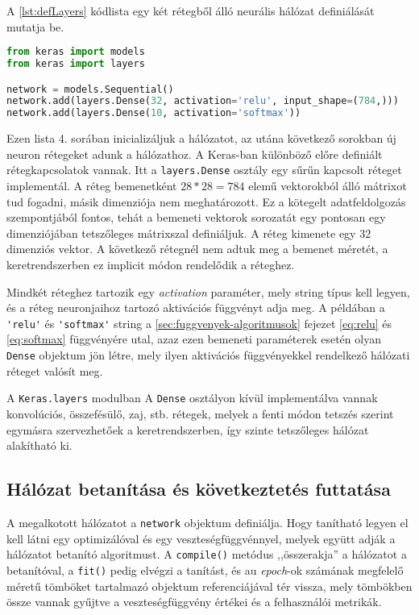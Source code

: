 A \ref{lst:defLayers} kódlista egy két rétegből álló neurális hálózat definiálását mutatja be.
\begin{minipage}{\linewidth}
\begin{lstlisting}[language=Python, caption=Két Neurális hálózat rétegeinek definiálása]
from keras import models
from keras import layers

network = models.Sequential()
network.add(layers.Dense(32, activation='relu', input_shape=(784,)))
network.add(layers.Dense(10, activation='softmax'))
\end{lstlisting}\label{lst:defLayers}
\end{minipage}
Ezen lista 4. sorában inicializáljuk a hálózatot, az utána következő sorokban új neuron rétegeket adunk a hálózathoz. A Keras-ban különböző előre definiált rétegkapcsolatok vannak. Itt a \verb|layers.Dense| osztály egy sűrűn kapcsolt réteget implementál. %
A réteg bemenetként $28 *28 = 784$ elemű vektorokból álló mátrixot tud fogadni, másik dimenziója nem meghatározott. Ez a kötegelt adatfeldolgozás szempontjából fontos, tehát a bemeneti vektorok sorozatát egy pontosan egy dimenziójában tetszőleges mátrixszal definiáljuk. A réteg kimenete egy 32 dimenziós vektor. A következő rétegnél nem adtuk meg a bemenet méretét, a keretrendszerben ez implicit módon rendelődik a réteghez. 

Mindkét réteghez tartozik egy \emph{activation} paraméter, mely string típus kell legyen, és a réteg neuronjaihoz tartozó aktivációs függvényt adja meg. A példában a \verb|'relu'| és \verb|'softmax'| string a \ref{sec:fuggvenyek-algoritmusok} fejezet \eqref{eq:relu} és \eqref{eq:softmax} függvényére utal, azaz ezen bemeneti paraméterek esetén olyan \verb|Dense| objektum jön létre, mely ilyen aktivációs függvényekkel rendelkező hálózati réteget valósít meg.

A \verb|Keras.layers| modulban A \verb|Dense| osztályon kívül implementálva vannak konvolúciós, összefésülő, zaj, stb. rétegek, melyek a fenti módon tetszés szerint egymásra szervezhetőek a keretrendszerben, így szinte tetszőleges hálózat alakítható ki.

\subsection{Hálózat betanítása és következtetés futtatása}

A megalkotott hálózatot a \verb|network| objektum definiálja. Hogy tanítható legyen el kell látni egy optimizálóval és egy veszteségfüggvénnyel, melyek együtt adják a hálózatot betanító algoritmust. A \verb|compile()| metódus ,,összerakja'' a hálózatot a betanítóval, a \verb|fit()| pedig elvégzi a tanítást, és au \emph{epoch}-ok számának megfelelő méretű tömböket tartalmazó objektum referenciájával tér vissza, mely tömbökben össze vannak gyűjtve a veszteségfüggvény értékei és a felhasználói metrikák. 

